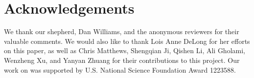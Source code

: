 \section*{Acknowledgements}

We thank our shepherd, Dan Williams, and the anonymous reviewers for their valuable comments. 
We would also like to thank Lois Anne DeLong for her efforts on this paper, 
as well as Chris Matthews, Shengqian Ji, Qishen Li, Ali Gholami, Wenzheng Xu, and Yanyan Zhuang for their contributions to this project. 
Our work on \lip was supported by U.S. National Science Foundation Award 1223588. 
